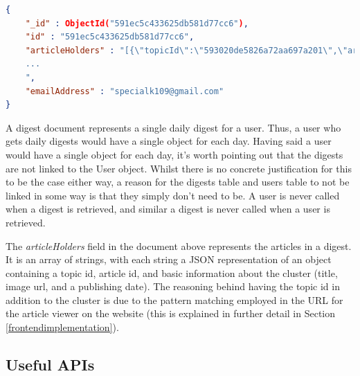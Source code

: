 \documentclass[12pt]{article}
\begin{document}
\begin{lstlisting}[language=json, firstnumber=1, caption={A sample document in the Digests table},captionpos=b]
{
    "_id" : ObjectId("591ec5c433625db581d77cc6"),
    "id" : "591ec5c433625db581d77cc6",
    "articleHolders" : "[{\"topicId\":\"593020de5826a72aa697a201\",\"articleId\":\"59322bc5acea820dd0c7ef37\",\"title\":\"Elon Musk 'intrigued' by India's objective of all-electric cars by 2030 - Times of India\",\"imageUrl\":\"http://timesofindia.indiatimes.com/photo/msid-58964385/58964385.jpg?53722\",\"lastPublished\":\"2017-06-03T08:40:00Z\"},{\"topicId\":\"5930210d5826a72aa697a227\",\"articleId\":\"59324084acea820dd0c7f65b\",\"title\":\"Kathy Griffin loses ALL of her tour gigs in wake of Trump scandal\",\"imageUrl\":\"http://i.dailymail.co.uk/i/pix/2017/06/03/05/410C672100000578-0-image-a-41_1496464334669.jpg\",\"lastPublished\":\"2017-06-03T04:39:14Z\"},{\"topicId\":\"593020de5826a72aa697a201\",\"articleId\":\"59323dddacea820dd0c7f566\",\"title\":\"Putin says hacking of Democratic Party may have been CIA false flag op\",\"imageUrl\":\"http://i.dailymail.co.uk/i/pix/2017/06/03/05/410C6AD500000578-0-image-a-92_1496463783859.jpg\",\"lastPublished\":\"2017-06-03T04:28:04Z\"}
    ...
    ",
    "emailAddress" : "specialk109@gmail.com"
}
\end{lstlisting}

A digest document represents a single daily digest for a user. Thus, a user who gets daily digests would have a single object for each day. Having said a user would have a single object for each day, it's worth pointing out that the digests are not linked to the User object. Whilst there is no concrete justification for this to be the case either way, a reason for the digests table and users table to not be linked in some way is that they simply don't need to be. A user is never called when a digest is retrieved, and similar a digest is never called when a user is retrieved.

The \emph{articleHolders} field in the document above represents the articles in a digest. It is an array of strings, with each string a JSON representation of an object containing a topic id, article id, and basic information about the cluster (title, image url, and a publishing date). The reasoning behind having the topic id in addition to the cluster is due to the pattern matching employed in the URL for the article viewer on the website (this is explained in further detail in Section \ref{frontendimplementation}).

\subsection{Useful APIs}
\end{document}

